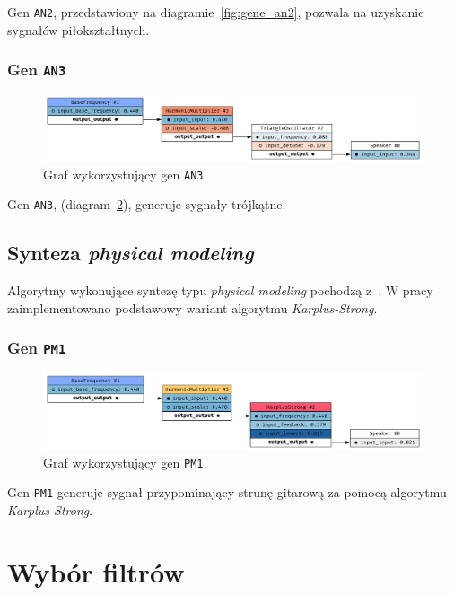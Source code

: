 Gen \texttt{AN2}, przedstawiony na diagramie~\ref{fig:gene_an2}, pozwala na uzyskanie sygnałów piłokształtnych.


\subsubsection{Gen \texttt{AN3}}

\begin{figure}[H]
    \centering
    \includegraphics[width=1.0\linewidth]{rys06/gene_an3.png}
    \caption{
      Graf wykorzystujący gen \texttt{AN3}.
    }\label{fig:gene_an3}
\end{figure}

Gen \texttt{AN3}, (diagram~\ref{fig:gene_an3}), generuje sygnały trójkątne.


\subsection{Synteza \textit{physical modeling}}

Algorytmy wykonujące syntezę typu \textit{physical modeling}
pochodzą z~\cite{computational_music_synthesis}. W pracy zaimplementowano
podstawowy wariant algorytmu \textit{Karplus-Strong}.

\subsubsection{Gen \texttt{PM1}}

\begin{figure}[H]
    \centering
    \includegraphics[width=1.0\linewidth]{rys06/gene_pm1.png}
    \caption{
      Graf wykorzystujący gen \texttt{PM1}.
    }\label{fig:gene_an3}
\end{figure}

Gen \texttt{PM1} generuje sygnał przypominający strunę gitarową 
za pomocą algorytmu \textit{Karplus-Strong}.

\section{Wybór filtrów}\label{sec:filters_selection_graph_structure}

